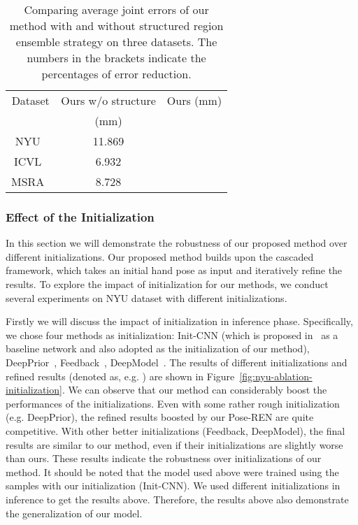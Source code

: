 \documentclass[final, 5p]{elsarticle}
\begin{document}
\begin{table}[!tb]
\centering
\caption{Comparing average joint errors of our method with and without structured region ensemble strategy on three datasets. The numbers in the brackets indicate the percentages of error reduction.}
\vspace{0.1cm}
\label{fig:nyu-ablation-structure}
\begin{tabular}{ccc}
\hline
Dataset & Ours w/o structure& Ours (mm)\\
 & (mm) & \\\hline
NYU~\cite{tompson2014real} & 11.869 &  \\
ICVL~\cite{tang2014latent} & 6.932 &  \\
MSRA~\cite{sun2015cascaded} & 8.728 &  \\\hline
\end{tabular}
\end{table}

\subsubsection{Effect of the Initialization}
\label{sec:ablation-init}
In this section we will demonstrate the robustness of our proposed method over different initializations.
Our proposed method builds upon the cascaded framework, which takes an initial hand pose as input and iteratively refine the results. To explore the impact of initialization for our methods, we conduct several experiments on NYU dataset with different initializations.

Firstly we will discuss the impact of initialization in inference phase. Specifically, we chose four methods as initialization: Init-CNN (which is proposed in~\cite{guo2017region} as a baseline network and also adopted as the initialization of our method),  DeepPrior~\cite{oberweger2015hands}, Feedback~\cite{oberweger2015training}, DeepModel~\cite{zhou2016model}.
The results of different initializations and refined results (denoted as, e.g. ) are shown in Figure~\ref{fig:nyu-ablation-initialization}. We can observe that our method can considerably boost the performances of the initializations. Even with some rather rough initialization (e.g. DeepPrior), the refined results boosted by our Pose-REN are quite competitive. With other better initializations (Feedback, DeepModel), the final results are similar to our method, even if their initializations are slightly worse than ours. These results indicate the robustness over initializations of our method.
It should be noted that the model used above were trained using the samples with our initialization (Init-CNN). We used different initializations in inference to get the results above. Therefore, the results above also demonstrate the generalization of our model.
\end{document}
